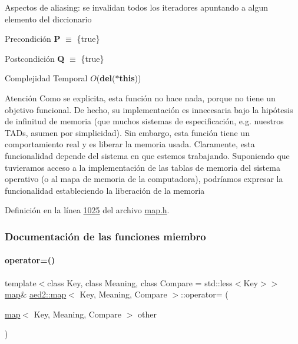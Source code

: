\begin{DoxyParagraph}{Aspectos de aliasing\+:}
se invalidan todos los iteradores apuntando a algun elemento del diccionario
\end{DoxyParagraph}
\begin{DoxyPrecond}{Precondición}
{\bfseries P} $\equiv$ \{true\} 
\end{DoxyPrecond}
\begin{DoxyPostcond}{Postcondición}
{\bfseries Q} $\equiv$ \{true\}
\end{DoxyPostcond}

\begin{DoxyDescription}
\item[Complejidad Temporal]$O$({\bfseries del}({\bfseries $\ast$this}))
\end{DoxyDescription}

\begin{DoxyAttention}{Atención}
Como se explicita, esta función no hace nada, porque no tiene un objetivo funcional. De hecho, su implementación es innecesaria bajo la hipótesis de infinitud de memoria (que muchos sistemas de especificación, e.\+g. nuestros T\+A\+Ds, asumen por simplicidad). Sin embargo, esta función tiene un comportamiento real y es liberar la memoria usada. Claramente, esta funcionalidad depende del sistema en que estemos trabajando. Suponiendo que tuvieramos acceso a la implementación de las tablas de memoria del sistema operativo (o al mapa de memoria de la computadora), podríamos expresar la funcionalidad estableciendo la liberación de la memoria 
\end{DoxyAttention}


Definición en la línea \hyperlink{map_8h_source_l01025}{1025} del archivo \hyperlink{map_8h_source}{map.\+h}.



\subsubsection{Documentación de las funciones miembro}
\mbox{\label{classaed2_1_1map_ac606d334809066929522964d45e76317_ac606d334809066929522964d45e76317}} 
\paragraph{\texorpdfstring{operator=()}{operator=()}}
{\footnotesize\ttfamily template$<$class Key, class Meaning, class Compare = std\+::less$<$\+Key$>$$>$ \\
\hyperlink{classaed2_1_1map}{map}\& \hyperlink{classaed2_1_1map}{aed2\+::map}$<$ Key, Meaning, Compare $>$\+::operator= (\begin{DoxyParamCaption}\item[{\hyperlink{classaed2_1_1map}{map}$<$ Key, Meaning, Compare $>$}]{other }\end{DoxyParamCaption})\hspace{0.3cm}{\ttfamily [inline]}}



